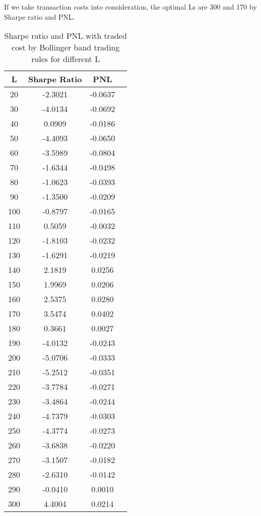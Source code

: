 \documentclass[11pt]{article}
\begin{document}
If we take transaction costs into consideration, the optimal Ls are 300 and 170 by Sharpe ratio and PNL.
\begin{table}[ht]
\centering
\begin{tabular}{cccc}
  \hline
 L & Sharpe Ratio & PNL \\ 
  \hline

   20 & -2.3021 & -0.0637 \\ 
     30 & -4.0134 & -0.0692 \\ 
     40 & 0.0909 & -0.0186 \\ 
     50 & -4.4093 & -0.0650 \\ 
     60 & -3.5989 & -0.0804 \\ 
     70 & -1.6344 & -0.0498 \\ 
     80 & -1.0623 & -0.0393 \\ 
     90 & -1.3500 & -0.0209 \\ 
    100 & -0.8797 & -0.0165 \\ 
    110 & 0.5059 & -0.0032 \\ 
    120 & -1.8103 & -0.0232 \\ 
    130 & -1.6291 & -0.0219 \\ 
    140 & 2.1819 & 0.0256 \\ 
    150 & 1.9969 & 0.0206 \\ 
    160 & 2.5375 & 0.0280 \\ 
    170 & 3.5474 & 0.0402 \\ 
    180 & 0.3661 & 0.0027 \\ 
    190 & -4.0132 & -0.0243 \\ 
    200 & -5.0706 & -0.0333 \\ 
    210 & -5.2512 & -0.0351 \\ 
    220 & -3.7784 & -0.0271 \\ 
    230 & -3.4864 & -0.0244 \\ 
    240 & -4.7379 & -0.0303 \\ 
    250 & -4.3774 & -0.0273 \\ 
    260 & -3.6838 & -0.0220 \\ 
    270 & -3.1507 & -0.0182 \\ 
    280 & -2.6310 & -0.0142 \\ 
    290 & -0.0410 & 0.0010 \\ 
    300 & 4.4004 & 0.0214 \\ 
   \hline
\end{tabular}
\caption{Sharpe ratio and PNL with traded cost by Bollinger band trading rules for different L}\label{BB_tc}
\end{table}
\end{document}

